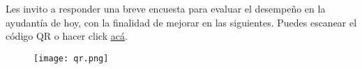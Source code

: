 \noindent Les invito a responder una breve encuesta para evaluar el desempeño en la ayudantía de hoy, con la finalidad de mejorar en las siguientes. Puedes escanear el código QR o hacer click \href{https://forms.office.com/r/0JwNEUVYjd}{acá}.

\begin{figure}[H]
    \centering
    \texttt{[image: qr.png]}
    \label{fig:qr}
\end{figure}

